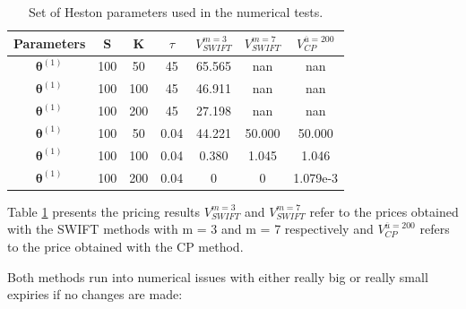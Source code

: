 \documentclass[12,twoside]{mammeTFM}
\theoremstyle{definition}
\theoremstyle{remark}
\begin{document}
\begin{table}[!h]
\begin{center}
 \begin{tabular}{|c | c | c | c | c | c | c |} 
 \hline
 Parameters & S & K & $\tau$ & $V_{SWIFT}^{m=3}$ & $V_{SWIFT}^{m=7}$ & $V_{CP}^{\overline{u} = 200}$ \\ [0.5ex] 
 \hline
 $\boldsymbol{\theta}^{(1)}$ & 100 & 50  & 45   & 65.565 & nan & nan \\ 
 \hline
 $\boldsymbol{\theta}^{(1)}$ & 100 & 100 & 45   & 46.911 & nan & nan \\ 
 \hline
 $\boldsymbol{\theta}^{(1)}$ & 100 & 200 & 45   & 27.198 & nan & nan \\ 
 \hline
 $\boldsymbol{\theta}^{(1)}$ & 100 & 50  & 0.04 & 44.221 & 50.000 & 50.000 \\ 
 \hline
 $\boldsymbol{\theta}^{(1)}$ & 100 & 100 & 0.04 & 0.380  & 1.045 & 1.046 \\ 
 \hline
 $\boldsymbol{\theta}^{(1)}$ & 100 & 200 & 0.04 & 0      & 0 & 1.079e-3 \\
 \hline
\end{tabular}
\end{center}
\caption{Set of Heston parameters used in the numerical tests. }\label{table:stress}
\end{table}

Table \ref{table:stress} presents the pricing results $V_{SWIFT}^{m=3}$ and $V_{SWIFT}^{m=7}$ refer to the prices obtained with the SWIFT methods with m = 3 and m = 7 respectively and $V_{CP}^{\overline{u} = 200}$ refers to the price obtained with the CP method.

Both methods run into numerical issues with either really big or really small expiries if no changes are made:
\end{document}
